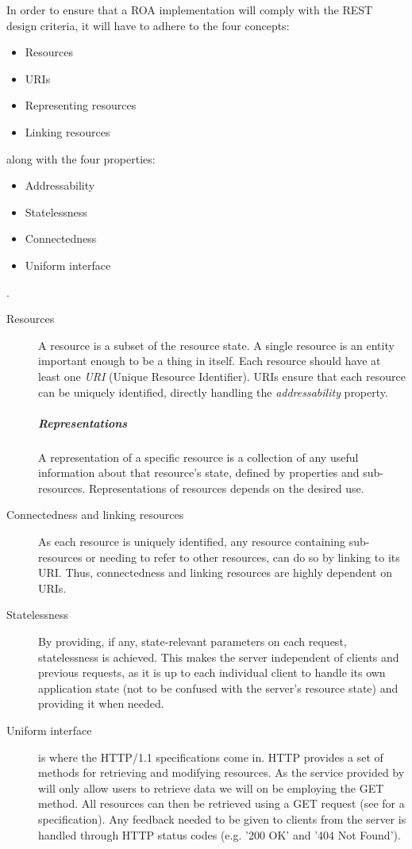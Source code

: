 In order to ensure that a ROA implementation will comply with the REST design criteria, it will have to adhere to the four concepts\cite[Chapter 4]{restful_web_services}:
\begin{itemize}
\item Resources
\item URIs
\item Representing resources
\item Linking resources
\end{itemize}
along with the four properties:
\begin{itemize}
\item Addressability
\item Statelessness
\item Connectedness
\item Uniform interface
\end{itemize}.
\begin{description}
\item[Resources] A resource is a subset of the resource state.
A single resource is an entity important enough to be a thing in itself.
Each resource should have at least one \textit{URI} (Unique Resource Identifier).
URIs ensure that each resource can be uniquely identified, directly handling the \textit{addressability} property.

\subparagraph{Representations} A representation of a specific resource is a collection of any useful information about that resource's state, defined by properties and sub-resources.
Representations of resources depends on the desired use.


\item[Connectedness and linking resources] As each resource is uniquely identified, any resource containing sub-resources or needing to refer to other resources, can do so by linking to its URI.
Thus, connectedness and linking resources are highly dependent on URIs.

\item[Statelessness] By providing, if any, state-relevant parameters on each request, statelessness is achieved.
This makes the server independent of clients and previous requests, as it is up to each individual client to handle its own application state (not to be confused with the server's resource state) and providing it when needed.

\item[Uniform interface] is where the HTTP/1.1 specifications come in.
HTTP provides a set of methods for retrieving and modifying resources.
As the service provided by \projectname{} will only allow users to retrieve data we will on be employing the GET method.
All resources can then be retrieved using a GET request (see  for a specification).
Any feedback needed to be given to clients from the server is handled through HTTP status codes (e.g. '200 OK' and '404 Not Found').
\end{description}